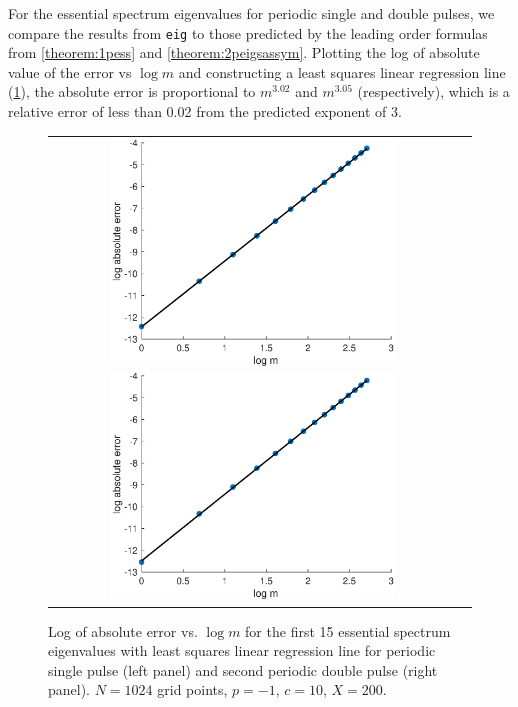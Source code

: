 \documentclass[10pt,reqno]{amsart}
\theoremstyle{plain}
\theoremstyle{definition}
\theoremstyle{remark}
\numberwithin{theorem}{section}
\numberwithin{equation}{section}
\begin{document}
For the essential spectrum eigenvalues for periodic single and double pulses, we compare the results from \texttt{eig} to those predicted by the leading order formulas from \cref{theorem:1pess} and \cref{theorem:2peigsassym}. Plotting the log of absolute value of the error vs $\log m$ and constructing a least squares linear regression line (\cref{fig:DP2esslogerror}), the absolute error is proportional to $m^{3.02}$ and $m^{3.05}$ (respectively), which is a relative error of less than 0.02 from the predicted exponent of $3$.
\begin{figure}[H]
\begin{center}
\begin{tabular}{cc}
\includegraphics[width=7.5cm]{images/SPesslogerror.eps}
\includegraphics[width=7.5cm]{images/DP2esslogerror.eps} 
\end{tabular}
\end{center}
\caption{Log of absolute error vs. $\log m$ for the first 15 essential spectrum eigenvalues with least squares linear regression line for periodic single pulse (left panel) and second periodic double pulse (right panel). $N = 1024$ grid points, $p = -1$, $c = 10$, $X = 200$.}
\label{fig:DP2esslogerror}
\end{figure}
\end{document}
